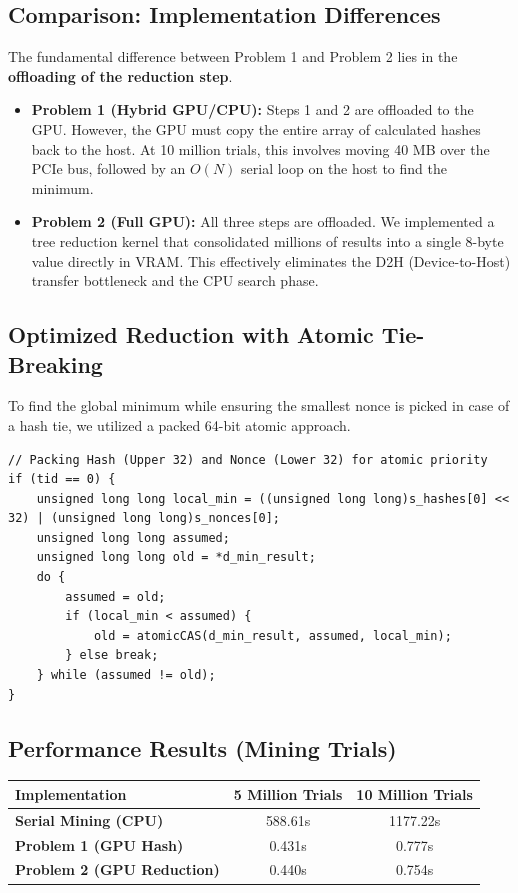 \documentclass[11pt]{article}
\begin{document}
\subsection*{Comparison: Implementation Differences}
The fundamental difference between Problem 1 and Problem 2 lies in the \textbf{offloading of the reduction step}.
\begin{itemize}
    \item \textbf{Problem 1 (Hybrid GPU/CPU):} Steps 1 and 2 are offloaded to the GPU. However, the GPU must copy the entire array of calculated hashes back to the host. At 10 million trials, this involves moving 40 MB over the PCIe bus, followed by an $O(N)$ serial loop on the host to find the minimum.
    \item \textbf{Problem 2 (Full GPU):} All three steps are offloaded. We implemented a tree reduction kernel that consolidated millions of results into a single 8-byte value directly in VRAM. This effectively eliminates the D2H (Device-to-Host) transfer bottleneck and the CPU search phase.
\end{itemize}

\subsection*{Optimized Reduction with Atomic Tie-Breaking}
To find the global minimum while ensuring the smallest nonce is picked in case of a hash tie, we utilized a packed 64-bit atomic approach.

\begin{lstlisting}
// Packing Hash (Upper 32) and Nonce (Lower 32) for atomic priority
if (tid == 0) {
    unsigned long long local_min = ((unsigned long long)s_hashes[0] << 32) | (unsigned long long)s_nonces[0];
    unsigned long long assumed;
    unsigned long long old = *d_min_result;
    do {
        assumed = old;
        if (local_min < assumed) {
            old = atomicCAS(d_min_result, assumed, local_min);
        } else break;
    } while (assumed != old);
}
\end{lstlisting}

\subsection*{Performance Results (Mining Trials)}
\begin{center}
\begin{tabular}{@{}lcc@{}}
\toprule
Implementation & 5 Million Trials & 10 Million Trials \\
\midrule
\textbf{Serial Mining (CPU)} & 588.61s & 1177.22s \\
\textbf{Problem 1 (GPU Hash)} & 0.431s & 0.777s \\
\textbf{Problem 2 (GPU Reduction)} & 0.440s & 0.754s \\
\bottomrule
\end{tabular}
\end{center}
\end{document}
